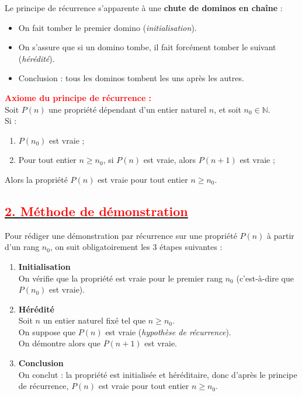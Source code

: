 \documentclass[12pt,a4paper]{article}
\begin{document}
Le principe de récurrence s'apparente à une \textbf{chute de dominos en chaîne} :
\begin{itemize}
    \item On fait tomber le premier domino (\textit{initialisation}).
    \item On s'assure que si un domino tombe, il fait forcément tomber le suivant (\textit{hérédité}).
    \item Conclusion : tous les dominos tombent les uns après les autres.
\end{itemize}

\textbf{\textcolor{red}{Axiome du principe de récurrence :}} \\
Soit $P(n)$ une propriété dépendant d'un entier naturel $n$, et soit $n_0 \in \mathbb{N}$. \\
Si :
\begin{enumerate}[label=\arabic*.]
    \item $P(n_0)$ est vraie ;
    \item Pour tout entier $n \ge n_0$, si $P(n)$ est vraie, alors $P(n+1)$ est vraie ;
\end{enumerate}
Alors la propriété $P(n)$ est vraie pour tout entier $n \ge n_0$.

\subsection*{\underline{\textbf{\textcolor{red}{2. Méthode de démonstration}}}}

Pour rédiger une démonstration par récurrence sur une propriété $P(n)$ à partir d'un rang $n_0$, on suit obligatoirement les 3 étapes suivantes :

\begin{enumerate}[label=\textbf{Étape \arabic* :}]
    \item \textbf{Initialisation} \\
    On vérifie que la propriété est vraie pour le premier rang $n_0$ (c'est-à-dire que $P(n_0)$ est vraie).

    \item \textbf{Hérédité} \\
    Soit $n$ un entier naturel fixé tel que $n \ge n_0$. \\
    On suppose que $P(n)$ est vraie (\textit{hypothèse de récurrence}). \\
    On démontre alors que $P(n+1)$ est vraie.

    \item \textbf{Conclusion} \\
    On conclut : la propriété est initialisée et héréditaire, donc d'après le principe de récurrence, $P(n)$ est vraie pour tout entier $n \ge n_0$.
\end{enumerate}
\end{document}
